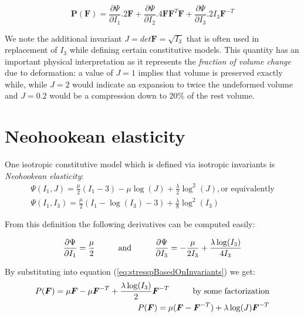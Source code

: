 \begin{equation}
\label{eq:stresspBasedOnInvariants}
 \boldsymbol{P}(\boldsymbol{F})=\frac{\partial \Psi}{\partial I_1}.2\boldsymbol{F} + 
 \frac{\partial \Psi}{\partial I_2}.4\boldsymbol{F}\boldsymbol{F}^T\boldsymbol{F} +
 \frac{\partial \Psi}{\partial I_3}.2 I_3\boldsymbol{F}^{-T}
\end{equation}

We note the additional invariant $J=det \boldsymbol{F}=\sqrt{I_3}$ that is often used in replacement of $I_3$ while defining certain constitutive models.
This quantity has an important physical interpretation as it represents the \textit{fraction of volume change} due to deformation:
a value of $J=1$ implies that volume is preserved exactly while, while $J=2$ would indicate an expansion to twice the undeformed volume and $J=0.2$
would be a compression down to $20\%$ of the rest volume.

\section{Neohookean elasticity}
One isotropic constitutive model which is defined via isotropic invariants is \textit{Neohookean elasticity}:
\begin{align}
\label{eq:NeohookeanStrainEnergy}
 \Psi(I_1, J) = \frac{\mu}{2}(I_1-3)-\mu \log(J)+ \frac{\lambda}{2} \log^2(J), \text{or equivalently}\nonumber\\
 \Psi(I_1, I_3)=\frac{\mu}{2}(I_1-\log(I_3)-3)+\frac{\lambda}{8}\log^2(I_3)
\end{align}

From this definition the following derivatives can be computed easily:

\begin{gather*}
 \frac{\partial \Psi}{\partial I_1}=\frac{\mu}{2}\hspace{10mm}\text{and}\hspace{10mm}\frac{\partial \Psi}{\partial I_3}=-\frac{\mu}{2I_3}+\frac{\lambda \log(I_3)}{4 I_3}
\end{gather*}

By substituting into equation (\ref{eq:stresspBasedOnInvariants}) we get:
\begin{align}
\label{eq:NeohookeanStress}
 P(\boldsymbol{F})=\mu\boldsymbol{F}-\mu\boldsymbol{F}^{-T}+\frac{\lambda \log (I_3) }{2}\boldsymbol{F}^{-T}\hspace{10mm}\text{by some factorization}\nonumber\\
 P(\boldsymbol{F})=\mu(\boldsymbol{F}-\boldsymbol{F}^{-T})+\lambda\log(J)\boldsymbol{F}^{-T}
\end{align}

